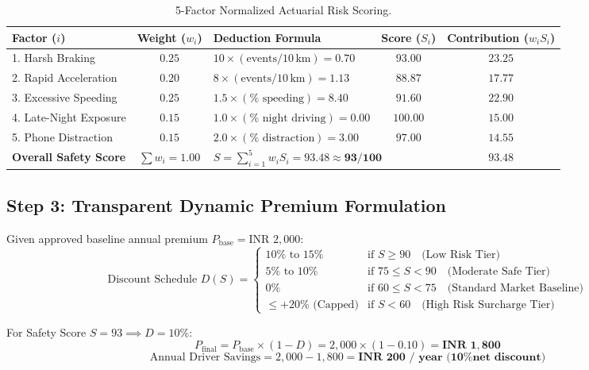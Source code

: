 \documentclass[11pt,a4paper]{article}
\begin{document}
\begin{table}[h!]
\centering
\small
\begin{tabular}{l c l c c}
\toprule
\textbf{Factor ($i$)} & \textbf{Weight ($w_i$)} & \textbf{Deduction Formula} & \textbf{Score ($S_i$)} & \textbf{Contribution ($w_i S_i$)} \\
\midrule
1. Harsh Braking & $0.25$ & $10 \times (\text{events} / 10\,\text{km}) = 0.70$ & $93.00$ & $23.25$ \\
2. Rapid Acceleration & $0.20$ & $8 \times (\text{events} / 10\,\text{km}) = 1.13$ & $88.87$ & $17.77$ \\
3. Excessive Speeding & $0.25$ & $1.5 \times (\% \text{ speeding}) = 8.40$ & $91.60$ & $22.90$ \\
4. Late-Night Exposure & $0.15$ & $1.0 \times (\% \text{ night driving}) = 0.00$ & $100.00$ & $15.00$ \\
5. Phone Distraction & $0.15$ & $2.0 \times (\% \text{ distraction}) = 3.00$ & $97.00$ & $14.55$ \\
\midrule
\textbf{Overall Safety Score} & $\sum w_i = 1.00$ & \multicolumn{2}{l}{$S = \sum_{i=1}^5 w_i S_i = 93.48 \approx \mathbf{93/100}$} & $\mathbf{93.48}$ \\
\bottomrule
\end{tabular}
\caption{5-Factor Normalized Actuarial Risk Scoring.}
\end{table}

\subsection{Step 3: Transparent Dynamic Premium Formulation}
Given approved baseline annual premium $P_{\text{base}} = \text{INR } 2,000$:
\begin{equation}
    \text{Discount Schedule } D(S) = 
    \begin{cases}
    10\% \text{ to } 15\% & \text{if } S \ge 90 \quad \text{(Low Risk Tier)} \\
    5\% \text{ to } 10\% & \text{if } 75 \le S < 90 \quad \text{(Moderate Safe Tier)} \\
    0\% & \text{if } 60 \le S < 75 \quad \text{(Standard Market Baseline)} \\
    \le +20\% \text{ (Capped)} & \text{if } S < 60 \quad \text{(High Risk Surcharge Tier)}
    \end{cases}
\end{equation}

For Safety Score $S = 93 \implies D = 10\%$:
\begin{equation}
    P_{\text{final}} = P_{\text{base}} \times (1 - D) = 2,000 \times (1 - 0.10) = \mathbf{\text{INR } 1,800}
\end{equation}
\begin{equation}
    \text{Annual Driver Savings} = 2,000 - 1,800 = \mathbf{\text{INR } 200 \text{ / year (10\% net discount)}}
\end{equation}
\end{document}
